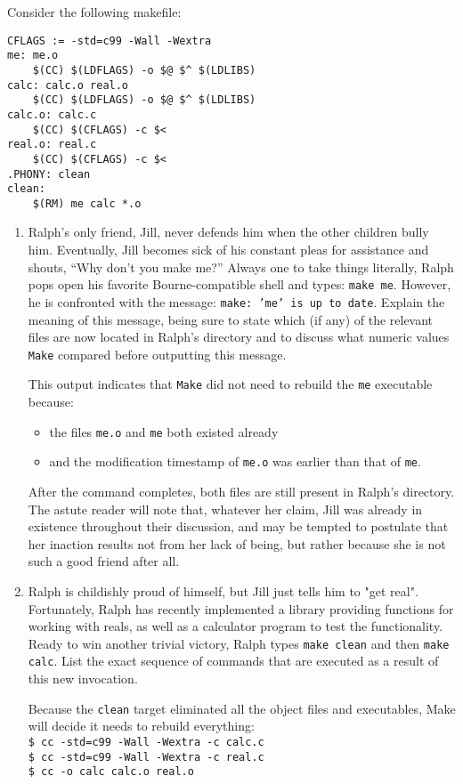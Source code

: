 Consider the following makefile:
\begin{lstlisting}
CFLAGS := -std=c99 -Wall -Wextra
me: me.o
    $(CC) $(LDFLAGS) -o $@ $^ $(LDLIBS)
calc: calc.o real.o
	$(CC) $(LDFLAGS) -o $@ $^ $(LDLIBS)
calc.o: calc.c
	$(CC) $(CFLAGS) -c $<
real.o: real.c
	$(CC) $(CFLAGS) -c $<
.PHONY: clean
clean:
	$(RM) me calc *.o
\end{lstlisting}

\begin{enumerate}
\item
Ralph's only friend, Jill, never defends him when the other children bully him.
Eventually, Jill becomes sick of his constant pleas for assistance and shouts, ``Why don't you make me?''
Always one to take things literally, Ralph pops open his favorite Bourne-compatible shell and types: \texttt{make me}.
However, he is confronted with the message: \texttt{make:\ 'me' is up to date}.
Explain the meaning of this message, being sure to state which (if any) of the relevant files are now located in Ralph's directory and to discuss what numeric values \texttt{Make} compared before outputting this message.

\begin{answer}
This output indicates that \texttt{Make} did not need to rebuild the \texttt{me} executable because:
\begin{itemize}
	\item the files \texttt{me.o} and \texttt{me} both existed already
	\item and the modification timestamp of \texttt{me.o} was earlier than that of \texttt{me}.
\end{itemize}
After the command completes, both files are still present in Ralph's directory.
The astute reader will note that, whatever her claim, Jill was already in existence throughout their discussion, and may be tempted to postulate that her inaction results not from her lack of being, but rather because she is not such a good friend after all.
\end{answer}

\item
Ralph is childishly proud of himself, but Jill just tells him to "get real".
Fortunately, Ralph has recently implemented a library providing functions for working with reals, as well as a calculator program to test the functionality.
Ready to win another trivial victory, Ralph types \texttt{make clean} and then \texttt{make calc}.
List the exact sequence of commands that are executed as a result of this new invocation.

\begin{answer}
Because the \texttt{clean} target eliminated all the object files and executables, Make will decide it needs to rebuild everything: \\
\texttt{\$ cc -std=c99 -Wall -Wextra -c calc.c} \\
\texttt{\$ cc -std=c99 -Wall -Wextra -c real.c} \\
\texttt{\$ cc -o calc calc.o real.o}
\end{answer}
\end{enumerate}
